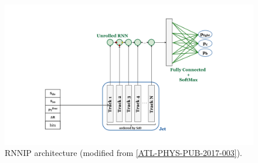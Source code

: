 \begin{figure}[htbp]
\centering
\includegraphics[width=0.8\linewidth]{figures/ftag/RNN-graphic}
\caption{RNNIP architecture (modified from \ref{ATL-PHYS-PUB-2017-003}).}
 \label{fig:RNN-graphic}
\end{figure}


